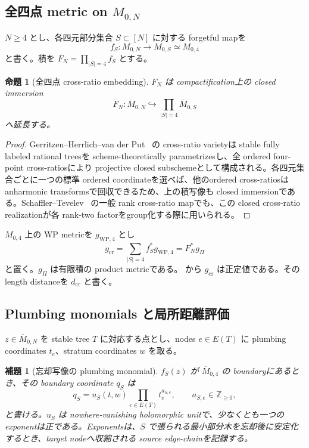 \documentclass[11pt,a4paper]{ltjsarticle}
\newcommand{\ZZ}{\mathbb Z}
\newcommand{\ov}{\overline}
\theoremstyle{plain}
\newtheorem{proposition}[proposition]{命題}
\newtheorem{lemma}[lemma]{補題}
\theoremstyle{definition}
\theoremstyle{remark}
\begin{document}
\subsection{\texorpdfstring{全四点 metric on $M_{0,N}$}{全四点 metric on M0,N}}
$N\ge4$ とし、各四元部分集合 $S\subset[N]$ に対する forgetful mapを
\[
 f_S:M_{0,N}\longrightarrow M_{0,S}\simeq M_{0,4}
\]
と書く。積を $F_N=\prod_{|S|=4}f_S$ とする。

\begin{proposition}[全四点 cross-ratio embedding]
\label{prop:crossratio-embedding}
$F_N$ は compactification上の closed immersion
\[
 \ov F_N:\ov M_{0,N}\hookrightarrow
 \prod_{|S|=4}\ov M_{0,S}
\]
へ延長する。
\end{proposition}

\begin{proof}
Gerritzen--Herrlich--van der Put~\cite{GHP} の cross-ratio varietyは stable fully labeled rational treesを scheme-theoretically parametrizesし、全 ordered four-point cross-ratiosにより projective closed subschemeとして構成される。各四元集合ごとに一つの標準 ordered coordinateを選べば、他のordered cross-ratiosは anharmonic transformsで回収できるため、上の積写像も closed immersionである。Schaffler--Tevelev~\cite[Corollary~3.5]{ST} の一般 rank cross-ratio mapでも、この closed cross-ratio realizationが各 rank-two factorをgroup化する際に用いられる。
\end{proof}

$M_{0,4}$ 上の WP metricを $g_{\mathrm{WP},4}$ とし
\begin{equation}
\label{eq:gcr}
 g_{\mathrm{cr}}
 =\sum_{|S|=4}f_S^*g_{\mathrm{WP},4}
 =F_N^*g_\Pi
\end{equation}
と置く。$g_\Pi$ は有限積の product metricである。 から $g_{\mathrm{cr}}$ は正定値である。その length distanceを $d_{\mathrm{cr}}$ と書く。

\subsection{Plumbing monomials と局所距離評価}
$z\in\ov M_{0,N}$ を stable tree $T$ に対応する点とし、nodes $e\in E(T)$ に plumbing coordinates $t_e$、stratum coordinates $w$ を取る。

\begin{lemma}[忘却写像の plumbing monomial]
\label{lem:plumbing-monomial}
$f_S(z)$ が $\ov M_{0,4}$ の boundaryにあるとき、その boundary coordinate $q_S$ は
\begin{equation}
\label{eq:plumbing-monomial}
 q_S=u_S(t,w)\prod_{e\in E(T)}t_e^{a_{S,e}},
 \qquad a_{S,e}\in\ZZ_{\ge0},
\end{equation}
と書ける。$u_S$ は nowhere-vanishing holomorphic unitで、少なくとも一つの exponentは正である。Exponentsは、$S$ で張られる最小部分木を忘却後に安定化するとき、target nodeへ収縮される source edge-chainを記録する。
\end{lemma}
\end{document}
